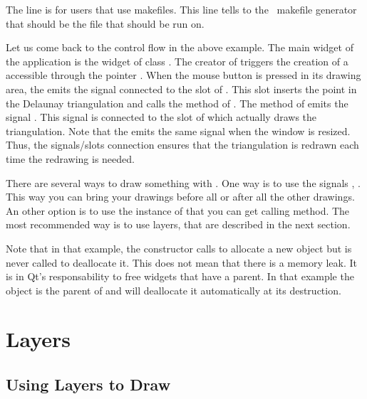 The line  is for users that use
makefiles. This line tells to the \cgal\ makefile generator that
 should be the file that  should be run on.

Let us come back to the control flow in the above example.
The main widget of the application is the widget 
of  class .  The creator  of 
 triggers the creation of a 
accessible through the pointer .
When  the mouse button is pressed in its drawing area,
the  
emits the signal  
connected to the slot  of .
This slot inserts the point in the Delaunay triangulation
and calls the method  of .
The   method of 
emits the signal . This signal is
connected to the slot 
of   which actually draws the triangulation.
Note that the    emits the same signal
 when the window is resized. Thus,
the signals/slots connection  ensures that the
triangulation is redrawn  each time the redrawing is needed.


\begin{ccAdvanced}
There are several ways to draw something with . One way
is to use the signals , .
This way you can bring your drawings before all or after all the
other drawings. An other option is to use the  instance 
of  that you can get calling 
method. The most recommended way is to use layers, that are described
in the next section.
\end{ccAdvanced}

Note that in that example, the  constructor calls
 to allocate a new  object but  is
never called to deallocate it. This does not mean that there is a
memory leak. It is in Qt's responsability to free widgets that have a
parent. In that example the  object is the parent of
 and will deallocate it automatically at its destruction.

\section{Layers}
\label{Qt_widget_layers}
\subsection{Using Layers to Draw}

